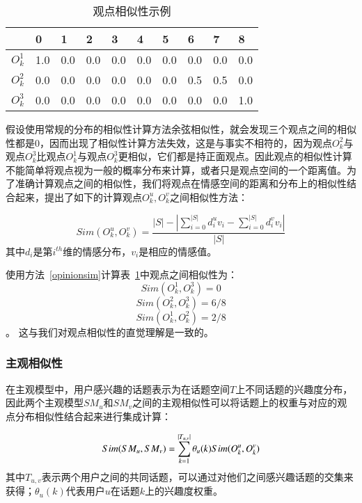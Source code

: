 \begin{table}[htb]
\centering
\caption{观点相似性示例}
\label{tab6-1}
\begin{tabular}{|l|l|l|l|l|l|l|l|l|l|}
\hline
 & 0 & 1& 2 & 3 & 4 & 5 & 6 & 7 & 8 \\
\hline
$O_{k}^{1}$ & 1.0 & 0.0 & 0.0 & 0.0 & 0.0 & 0.0 & 0.0 & 0.0 & 0.0 \\
\hline
$O_{k}^{2}$ & 0.0 & 0.0 & 0.0 & 0.0 & 0.0 & 0.0 & 0.5 & 0.5 & 0.0 \\
\hline
$O_{k}^{3}$ & 0.0 & 0.0 & 0.0 & 0.0 & 0.0 & 0.0 & 0.0 & 0.0 & 1.0 \\
\hline
\end{tabular}
\end{table} 

假设使用常规的分布的相似性计算方法余弦相似性，就会发现三个观点之间的相似性都是0，因而出现了相似性计算方法失效，这是与事实不相符的，因为观点$ O_{k}^{2} $与观点$ O_{k}^{3} $比观点$ O_{k}^{1} $与观点$ O_{k}^{3} $更相似，它们都是持正面观点。因此观点的相似性计算不能简单将观点视为一般的概率分布来计算，或者只是观点空间的一个距离值。为了准确计算观点之间的相似性，我们将观点在情感空间的距离和分布上的相似性结合起来，提出了如下的计算观点$O_{k}^{u},O_{k}^{v} $之间相似性方法：

\begin{equation}
\label{opinionsim}
Sim(O_{k}^{u},O_{k}^{v})=\dfrac{|S|-|\sum_{i=0}^{|S|}d_{i}^{u}v_{i}-\sum_{i=0}^{|S|}d_{i}^{v}v_{i}|}{|S|}
\end{equation}
其中$ d_{i} $是第$ i^{th} $维的情感分布，$ v_{i} $是相应的情感值。

使用方法~\ref{opinionsim}计算表~\ref{tab6-1}中观点之间相似性为：
$$ Sim(O_{k}^{1},O_{k}^{3})=0 $$ $$ Sim(O_{k}^{2},O_{k}^{3})=6/8$$ $$ Sim(O_{k}^{1},O_{k}^{2})=2/8 $$。
这与我们对观点相似性的直觉理解是一致的。

\subsubsection{主观相似性}
在主观模型中，用户感兴趣的话题表示为在话题空间$ T $上不同话题的兴趣度分布，因此两个主观模型$SM_u$和$SM_v$之间的主观相似性可以将话题上的权重与对应的观点分布相似性结合起来进行集成计算：

\begin{equation}
\label{subsim}
Sim(SM_{u},SM_{v})=\sum_{k=1}^{|T_{u,v}|}\theta_{u}(k)\* Sim(O_{k}^{u},O_{k}^{v})
\end{equation}
其中$ T_{u,v} $表示两个用户之间的共同话题，可以通过对他们之间感兴趣话题的交集来获得；$ \theta_{u}(k) $代表用户$ u $在话题$ k $上的兴趣度权重。

